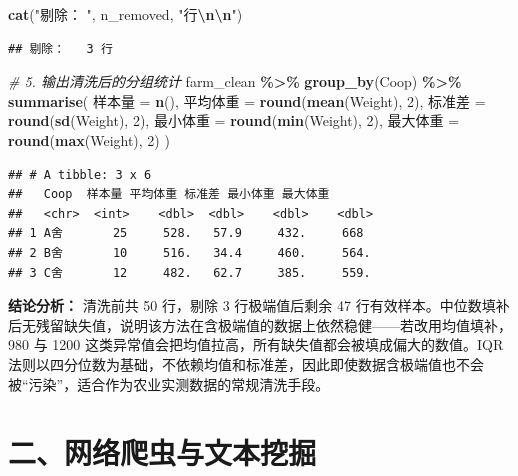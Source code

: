 \documentclass[
]{ctexart}
\newenvironment{Shaded}{\begin{snugshade}}{\end{snugshade}}
\newcommand{\CommentTok}[1]{\textcolor[rgb]{0.56,0.35,0.01}{\textit{#1}}}
\newcommand{\DecValTok}[1]{\textcolor[rgb]{0.00,0.00,0.81}{#1}}
\newcommand{\FunctionTok}[1]{\textcolor[rgb]{0.13,0.29,0.53}{\textbf{#1}}}
\newcommand{\NormalTok}[1]{#1}
\newcommand{\OtherTok}[1]{\textcolor[rgb]{0.56,0.35,0.01}{#1}}
\newcommand{\SpecialCharTok}[1]{\textcolor[rgb]{0.81,0.36,0.00}{\textbf{#1}}}
\newcommand{\StringTok}[1]{\textcolor[rgb]{0.31,0.60,0.02}{#1}}
\begin{document}
\begin{Shaded}
\begin{Highlighting}[]
\FunctionTok{cat}\NormalTok{(}\StringTok{"剔除：  "}\NormalTok{, n\_removed, }\StringTok{"行}\SpecialCharTok{\textbackslash{}n\textbackslash{}n}\StringTok{"}\NormalTok{)}
\end{Highlighting}
\end{Shaded}

\begin{verbatim}
## 剔除：   3 行
\end{verbatim}

\begin{Shaded}
\begin{Highlighting}[]
\CommentTok{\# 5. 输出清洗后的分组统计}
\NormalTok{farm\_clean }\SpecialCharTok{\%\textgreater{}\%}
  \FunctionTok{group\_by}\NormalTok{(Coop) }\SpecialCharTok{\%\textgreater{}\%}
  \FunctionTok{summarise}\NormalTok{(}
\NormalTok{    样本量   }\OtherTok{=} \FunctionTok{n}\NormalTok{(),}
\NormalTok{    平均体重 }\OtherTok{=} \FunctionTok{round}\NormalTok{(}\FunctionTok{mean}\NormalTok{(Weight), }\DecValTok{2}\NormalTok{),}
\NormalTok{    标准差   }\OtherTok{=} \FunctionTok{round}\NormalTok{(}\FunctionTok{sd}\NormalTok{(Weight), }\DecValTok{2}\NormalTok{),}
\NormalTok{    最小体重 }\OtherTok{=} \FunctionTok{round}\NormalTok{(}\FunctionTok{min}\NormalTok{(Weight), }\DecValTok{2}\NormalTok{),}
\NormalTok{    最大体重 }\OtherTok{=} \FunctionTok{round}\NormalTok{(}\FunctionTok{max}\NormalTok{(Weight), }\DecValTok{2}\NormalTok{)}
\NormalTok{  )}
\end{Highlighting}
\end{Shaded}

\begin{verbatim}
## # A tibble: 3 x 6
##   Coop  样本量 平均体重 标准差 最小体重 最大体重
##   <chr>  <int>    <dbl>  <dbl>    <dbl>    <dbl>
## 1 A舍       25     528.   57.9     432.     668 
## 2 B舍       10     516.   34.4     460.     564.
## 3 C舍       12     482.   62.7     385.     559.
\end{verbatim}

\textbf{结论分析：} 清洗前共 50 行，剔除 3 行极端值后剩余 47
行有效样本。中位数填补后无残留缺失值，说明该方法在含极端值的数据上依然稳健------若改用均值填补，980
与 1200 这类异常值会把均值拉高，所有缺失值都会被填成偏大的数值。IQR
法则以四分位数为基础，不依赖均值和标准差，因此即使数据含极端值也不会被``污染''，适合作为农业实测数据的常规清洗手段。

\section{二、网络爬虫与文本挖掘}\label{ux4e8cux7f51ux7edcux722cux866bux4e0eux6587ux672cux6316ux6398}
\end{document}
